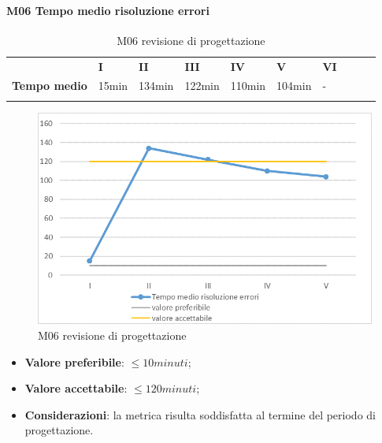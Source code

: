 \paragraph{M06 Tempo medio risoluzione errori} \mbox{}
\begin{longtable}[H!] {						
		>{}p{38mm}  		
		>{}p{12mm}
		>{}p{12mm}		
		>{}p{12mm}		
		>{}p{12mm}		
		>{}p{12mm}		
		>{}p{12mm}
		>{}p{12mm}
		>{}p{12mm}
		>{}p{12mm}
	}
	\rowcolor{gray!50}
	\textbf{} & \textbf{I} & \textbf{II} & \textbf{III} & \textbf{IV} & \textbf{V} & \textbf{VI} \TBstrut \\ [2mm]
	\textbf{Tempo medio} & 15min & 134min & 122min & 110min & 104min & - \TBstrut \\ [2mm]
	\rowcolor{white}
	\caption{M06 revisione di progettazione}
\end{longtable}
\begin{figure}[H] 	
\includegraphics[width=\linewidth]{./img/grafici/RP12.png}	
\caption{M06 revisione di progettazione}	
\end{figure}
\begin{itemize}
	\item \textbf{Valore preferibile}: $\le10minuti$;
	\item \textbf{Valore accettabile}: $\le120minuti$;
	\item \textbf{Considerazioni}: la metrica risulta soddisfatta al termine del periodo di progettazione.
\end{itemize}
